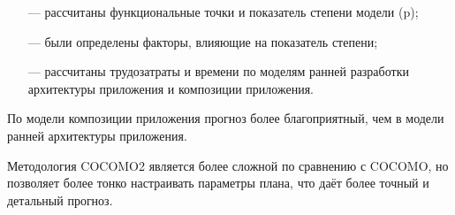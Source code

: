 \begin{itemize}
    \item[---] рассчитаны функциональные точки и показатель степени модели (p);
    \item[---] были определены факторы, влияющие на показатель степени;
    \item[---] рассчитаны трудозатраты и времени по моделям ранней разработки архитектуры приложения и композиции приложения.
\end{itemize}

По модели композиции приложения прогноз более благоприятный, чем в
модели ранней архитектуры приложения.

Методология COCOMO2 является более сложной по сравнению с COCOMO,
но позволяет более тонко настраивать параметры плана, что даёт более точный
и детальный прогноз.